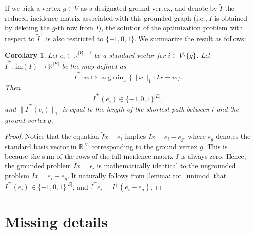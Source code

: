 \documentclass{article}
\newtheorem{corollary}{Corollary}[section]
\newcommand{\im}{\mathrm{im}}
\DeclareMathOperator*{\argmin}{arg\,min}
\begin{document}
If we pick a vertex $g\in V$ as a designated ground vertex,
and denote by $\tilde{I}$ the reduced incidence matrix associated with this grounded graph
(i.e.,
$\tilde{I}$ is obtained by deleting the $g$-th row from $I$),
the solution of the optimization problem with respect to $\tilde{I}^+$ is also restricted to $\{-1, 0, 1\}$.
We summarize the result as follows:
 
\begin{corollary}\label{cor:tot_unimod_ground}
Let $e_i\in \mathbb{R}^{|V|-1}$ be a standard vector for $i\in V\setminus \{g\}$.
Let $\tilde{I}^+: \im(I)\to \mathbb{R}^{|E|}$ be the map defined as
\[
\tilde{I}^+: w\mapsto \argmin_x\{ \|x\|_1 : \tilde{I}x=w \}.
\]
Then
\[
\tilde{I}^+(e_i)\in \{-1, 0, 1\}^{|E|},
\]
and $\|\tilde{I}^+(e_i)\|_1$ is equal to the length of the shortest path between $i$ and the ground vertex $g$.
\end{corollary}

\begin{proof}
Notice that the equation $\tilde{I}x=e_i$ implies $Ix=e_i-e_g$,
where $e_g$ denotes the standard basis vector in  $\mathbb{R}^{|V|}$ corresponding to the ground vertex $g$.
This is because the sum of the rows of the full incidence matrix $I$ is always zero. 
Hence,
the grounded problem $\tilde{I} x = e_i$ is mathematically identical to the ungrounded problem $I x = e_i - e_g$.
It naturally follows from \cref{lemma: tot_unimod} that $\tilde{I}^+(e_i)\in \{-1, 0, 1\}^{|E|}$,
and $\tilde{I}^+ e_i=I^+(e_i-e_g)$.
\end{proof}

\section{Missing details}
\end{document}
